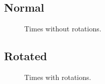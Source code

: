 \documentclass[a4paper, 12pt]{article}
\begin{document}
\subsection{Normal}

\begin{figure}
    \centering
        \caption{Times without rotations.}
    \label{fig:normal}  
\end{figure}

\subsection{Rotated}

\begin{figure}
    \centering
        \caption{Times with rotations.}
    \label{fig:rotated}  
\end{figure}
\end{document}
